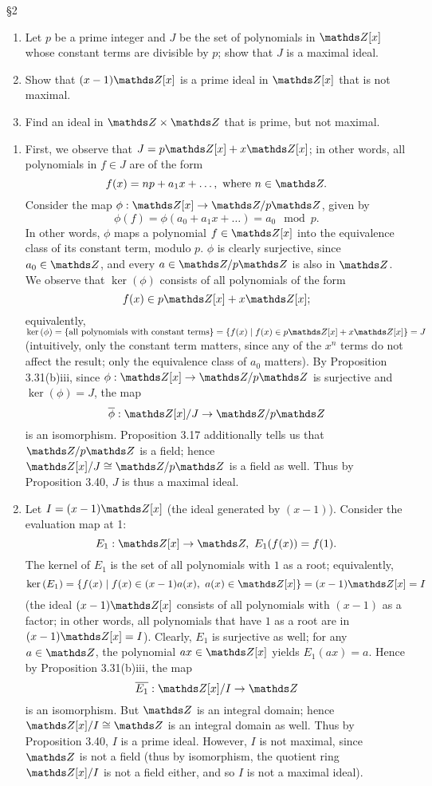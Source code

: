 \documentclass{homework}
\begin{document}
\begin{problem}{\S 2}
  \begin{enumerate}[label=(\alph*)]
    \item Let $p$ be a prime integer and $J$ be the set of polynomials in $\Z[x]$ whose constant
      terms are divisible by $p$; show that $J$ is a maximal ideal.
    \item Show that $(x-1)\Z[x]$ is a prime ideal in $\Z[x]$ that is not maximal.
    \item Find an ideal in $\Z\times\Z$ that is prime, but not maximal.
  \end{enumerate}
\end{problem}

\begin{solution}
  \begin{enumerate}[label=(\alph*)]
    \item 
      First, we observe that $J=p\Z[x]+x\Z[x]$; in other words, all polynomials in $f\in J$ are
      of the form \[ f(x)=np+a_1x+\ldots, ~\text{where}~ n\in \Z.\]
      Consider the map $\phi:\Z[x]\to \Z / p\Z$, given by \[
        \phi(f)=\phi(a_0+a_1x+\ldots)=a_0\mod{p}
      .\] In other words, $\phi$ maps a polynomial $f\in \Z[x]$ into the equivalence class of its
      constant term, modulo $p$. $\phi$ is clearly surjective, since $a_0\in \Z$, and every $a\in \Z
      / p\Z$ is also in $\Z$. We observe that $\ker{(\phi)}$ consists of all polynomials of the form
      \[
        f(x)\in p\Z[x]+x\Z[x]
      ;\] equivalently, $\ker{(\phi)}=\{ \text{all polynomials with constant terms}
      \}=\{f(x)\mid f(x)\in p\Z[x]+x\Z[x]\}=J$ (intuitively, only the constant term matters, since
      any of the $x^n$ terms do not affect the result; only the equivalence class of $a_0$ matters).
      By Proposition 3.31(b)iii, since $\phi: \Z[x]\to \Z / p\Z$ is surjective and $\ker{(\phi)}=J$,
      the map \[
        \overline{\phi}: \Z[x] / J \to \Z / p\Z
      \] is an isomorphism. Proposition 3.17 additionally tells us that $\Z / p\Z$ is a field; hence
      $\Z[x] / J \cong \Z / p\Z$ is a field as well. Thus by Proposition 3.40, $J$ is thus a maximal
      ideal.

    \item Let $I=(x-1)\Z[x]$ (the ideal generated by $(x-1)$). Consider the evaluation map at 1: \[
        E_1: \Z[x] \to \Z,\ E_1(f(x))=f(1)
        .\] The kernel of $E_1$ is the set of all polynomials with $1$ as a root; equivalently, \[
        \ker{(E_1)}=\{f(x)\mid f(x)\in (x-1)a(x),\ a(x)\in \Z[x]\} = (x-1)\Z[x]=I
      \] (the ideal $(x-1)\Z[x]$ consists of all polynomials with $(x-1)$ as a factor; in other words,
      all polynomials that have $1$ as a root are in $(x-1)\Z[x]=I$). Clearly, $E_1$ is surjective as
      well; for any $a\in \Z$, the polynomial $ax\in \Z[x]$ yields $E_1(ax)=a$. Hence by Proposition
      3.31(b)iii, the map \[
        \overline{E_1}:\Z[x] / I \to \Z
      \] is an isomorphism. But $\Z$ is an integral domain; hence $\Z[x] / I \cong \Z$ is an
      integral domain as well. Thus by Proposition 3.40, $I$ is a prime ideal. However, $I$
      is not maximal, since $\Z$ is not a field (thus by isomorphism, the quotient ring $\Z[x]
      / I$ is not a field either, and so $I$ is not a maximal ideal).


\end{enumerate}
\end{solution}
\end{document}

